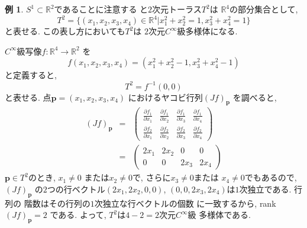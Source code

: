 \documentclass[a4j,12pt]{jarticle}
\theoremstyle{definition}
\newtheorem{example}[theorem]{例}
\begin{document}
\begin{example}
    $S^1 \subset \mathbb{R}^2$であることに注意する
    と$2$次元トーラス$T^2$は
    $\mathbb{R}^4$の部分集合として, 
    $$T^2=\{(x_1,x_2,x_3,x_4)\in \mathbb{R}^4|
    x_1^2+x_2^2=1, x_3^2+x_4^2=1\}$$
    と表せる. この表し方においても$T^2$は
    $2$次元$C^\infty$級多様体になる. 

    $C^\infty$級写像$f:\mathbb{R}^4\to \mathbb{R}^2$
    を
    $$f(x_1,x_2,x_3,x_4)=(x_1^2+x_2^2-1,
    x_3^2+x_4^2-1)$$と定義すると, 
    $$T^2=f^{-1}(0,0)$$
    と表せる. 点$\boldsymbol{p}=(x_1,x_2,x_3,x_4)$
    におけるヤコビ行列$(Jf)_{\boldsymbol{p}}$
    を調べると, 
    \begin{eqnarray*}
        (Jf)_{\boldsymbol{p}}&=&
        \left(\begin{array}{cccc}
            \frac{\partial f_1}{\partial x_1}&
            \frac{\partial f_1}{\partial x_2}&
            \frac{\partial f_1}{\partial x_3}&
            \frac{\partial f_1}{\partial x_4}\\
            \frac{\partial f_2}{\partial x_1}&
            \frac{\partial f_2}{\partial x_2}&
            \frac{\partial f_2}{\partial x_3}&
            \frac{\partial f_2}{\partial x_4}
        \end{array}\right)\\
        &=&
        \left(\begin{array}{cccc}
            2x_1&2x_2&0&0\\
            0&0&2x_3&2x_4
        \end{array}\right)
    \end{eqnarray*}
    $\boldsymbol{p}\in T^2$のとき, $x_1\neq 0$
    または$x_2\neq 0$で, さらに$x_3\neq 0$または
    $x_4\neq 0$でもあるので, $(Jf)_{\boldsymbol{p}}$
    の$2$つの行ベクトル$(2x_1,2x_2,0,0)$, 
    $(0,0,2x_3,2x_4)$は$1$次独立である. 行列の
    階数はその行列の$1$次独立な行ベクトルの個数
    に一致するから, rank$(Jf)_{\boldsymbol{p}}=2$
    である. 
    よって, $T^2$は$4-2=2$次元$C^\infty$級
    多様体である. 
\end{example}
\end{document}
